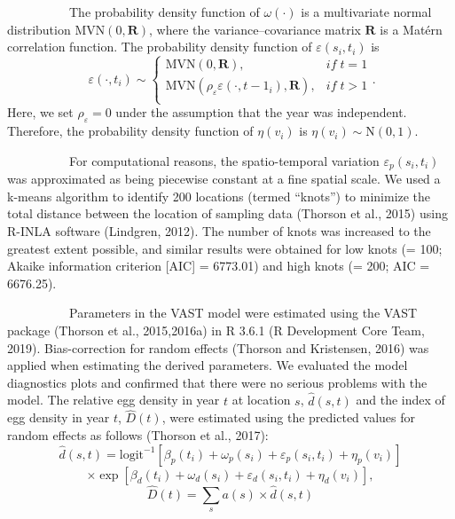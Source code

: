 \documentclass[12pt]{article}
\begin{document}
\begin{linenumbers}
{\ \ \ \ \ \ \ \ \ \ 
The probability density function of $\omega(\cdot)$ is a multivariate normal distribution $\mathrm{MVN}(0, \mathbf{R})$, where the variance--covariance matrix $\mathbf{R}$ is a Mat\'{e}rn correlation function. The probability density function of $\varepsilon(s_{i}, t_{i})$ is  
\[\
\varepsilon(\cdot, t_{i}) \sim \left\{
\begin{array}{ll}
\mathrm{MVN}(0, \mathbf{R}), &if \;t = 1\\
\mathrm{MVN}(\rho_{\varepsilon} \varepsilon(\cdot, t-1_{i}), \mathbf{R}), &if \;t > 1 \\
\end{array} \right.
. \] 
Here, we set $\rho_{\varepsilon} = 0$ under the assumption that the year was independent. Therefore, the probability density function of $\eta(v_{i})$ is $\eta(v_{i}) \sim \mathrm{N}(0, 1)$.

\ \ \ \ \ \ \ \ \ \ 
For computational reasons, the spatio-temporal variation $\varepsilon_{p}(s_{i}, t_{i})$ was approximated as being piecewise constant at a fine spatial scale. We used a k-means algorithm to identify 200 locations (termed ``knots'') to minimize the total distance between the location of sampling data (Thorson et al., 2015) using R-INLA software (Lindgren, 2012). The number of knots was increased to the greatest extent possible, and similar results were obtained for low knots (= 100; Akaike information criterion [AIC] = 6773.01) and high knots (= 200; AIC = 6676.25).

\ \ \ \ \ \ \ \ \ \ 
Parameters in the VAST model were estimated using the VAST package (Thorson et al., 2015,2016a) in R 3.6.1 (R Development Core Team, 2019). Bias-correction for random effects (Thorson and Kristensen, 2016) was applied when estimating the derived parameters. We evaluated the model diagnostics plots and confirmed that there were no serious problems with the model. The relative egg density in year $t$ at location $s$, $\hat{d}(s, t)$ and the index of egg density in year $t$, $\hat{D}(t)$, were estimated using the predicted values for random effects as follows (Thorson et al., 2017):
\newpage
\[
\hat{d}(s, t) = \mathrm{logit}^{-1}[\beta_{p}(t_{i}) + \omega_{p}(s_{i}) + \varepsilon_{p}(s_{i}, t_{i}) + \eta_{p}(v_{i})] 
\]
\[
\times \exp[\beta_{d}(t_{i}) + \omega_{d}(s_{i}) + \varepsilon_{d}(s_{i}, t_{i}) + \eta_{d}(v_{i})],
\]
\[\hat{D}(t) = \sum_{s} a(s) \times \hat{d}(s, t)
\]

}
\end{linenumbers}
\end{document}
